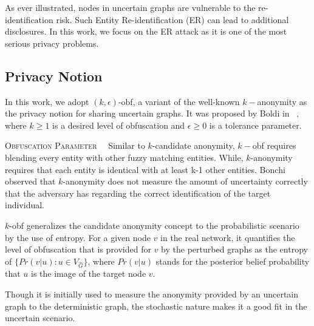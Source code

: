 As ever illustrated, nodes in uncertain graphs are vulnerable to the re-identification risk. Such Entity Re-identification (ER) can lead to additional disclosures. In this work, we focus on the ER attack as it is one of the most serious privacy problems. 
\subsection{Privacy Notion}
\label{sec:privacyNotion}
In this work, we adopt $(k,\epsilon)$-obf, a variant of the well-known $k-$anonymity as the privacy notion for sharing uncertain graphs. 
It was proposed by Boldi {\etal} in ~\cite{Boldi_Injecting_2012}, where $k \ge 1$ is a desired level of obfuscation and $\epsilon \ge 0$ is a tolerance parameter. 

\textsc{Obfuscation Parameter}~~
Similar to $k$-candidate anonymity, 
$k-$obf requires blending every entity with other fuzzy matching entities. 
While, $k$-anonymity requires that each entity is identical with at least k-1 other entities. 
Bonchi{\etal}~\cite{Bonchi_Identity_2014} observed that $k$-anonymity does not measure the amount of uncertainty correctly that the adversary has regarding the correct identification of the target individual. 

$k$-obf generalizes the candidate anonymity concept to the probabilistic scenario by the use of entropy. 
For a given node $v$ in the real network, it quantifies the level of obfuscation that is provided for $v$ by the perturbed graphs as the entropy of $\lbrace Pr(v|u) : u \in V_{\hat{G}}  \rbrace$, where $Pr(v|u)$ stands for the posterior belief probability that $u$ is the image of the target node $v$. 

Though it is initially used to measure the anonymity provided by an uncertain graph to the deterministic graph, the stochastic nature makes it a good fit in the uncertain scenario. 

